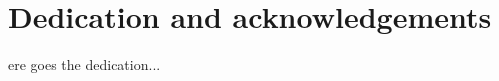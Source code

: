 %
%

\chapter*{Dedication and acknowledgements}
\begin{SingleSpace}
ere goes the dedication...
\end{SingleSpace}
\clearpage